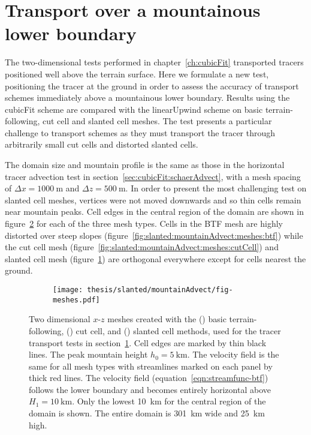 \section{Transport over a mountainous lower boundary}
\label{sec:slanted:mountainAdvect}

The two-dimensional tests performed in chapter~\ref{ch:cubicFit} transported tracers positioned well above the terrain surface.  Here we formulate a new test, positioning the tracer at the ground in order to assess the accuracy of transport schemes immediately above a mountainous lower boundary.  Results using the cubicFit scheme are compared with the linearUpwind scheme on basic terrain-following, cut cell and slanted cell meshes.
The test presents a particular challenge to transport schemes as they must transport the tracer through arbitrarily small cut cells and distorted slanted cells.

The domain size and mountain profile is the same as those in the horizontal tracer advection test in section~\ref{sec:cubicFit:schaerAdvect}, with a mesh spacing of $\Delta x = \SI{1000}{\meter}$ and $\Delta z = \SI{500}{\meter}$.
In order to present the most challenging test on slanted cell meshes, vertices were not moved downwards and so thin cells remain near mountain peaks.
Cell edges in the central region of the domain are shown in figure~\ref{fig:slanted:mountainAdvect:meshes} for each of the three mesh types.
Cells in the BTF mesh are highly distorted over steep slopes (figure~\ref{fig:slanted:mountainAdvect:meshes:btf}) while the cut cell mesh (figure~\ref{fig:slanted:mountainAdvect:meshes:cutCell}) and slanted cell mesh (figure~\ref{fig:slanted:mountainAdvect:meshes:slantedCell}) are orthogonal everywhere except for cells nearest the ground.

\begin{figure}
	\centering
	\begin{subfigure}{\textwidth}
		\label{fig:slanted:mountainAdvect:meshes:btf}
		\label{fig:slanted:mountainAdvect:meshes:cutCell}
		\label{fig:slanted:mountainAdvect:meshes:slantedCell}
		\texttt{[image: thesis/slanted/mountainAdvect/fig-meshes.pdf]}
	\end{subfigure}
%
	\caption{Two dimensional $x$-$z$ meshes created with the () basic terrain-following,
	() cut cell, and
	() slanted cell methods, used for the tracer transport tests in section~\ref{sec:slanted:mountainAdvect}.  Cell edges are marked by thin black lines.  The peak mountain height $h_0 = \SI{5}{\kilo\meter}$.
The velocity field is the same for all mesh types with streamlines marked on each panel by thick red lines.
The velocity field (equation~\ref{eqn:streamfunc-btf}) follows the lower boundary and becomes entirely horizontal above $H_1 = \SI{10}{\kilo\meter}$.
Only the lowest \SI{10}{\kilo\meter} for the central region of the domain is shown.  The entire domain is \SI{301}{\kilo\meter} wide and \SI{25}{\kilo\meter} high.}
	\label{fig:slanted:mountainAdvect:meshes}
\end{figure}

